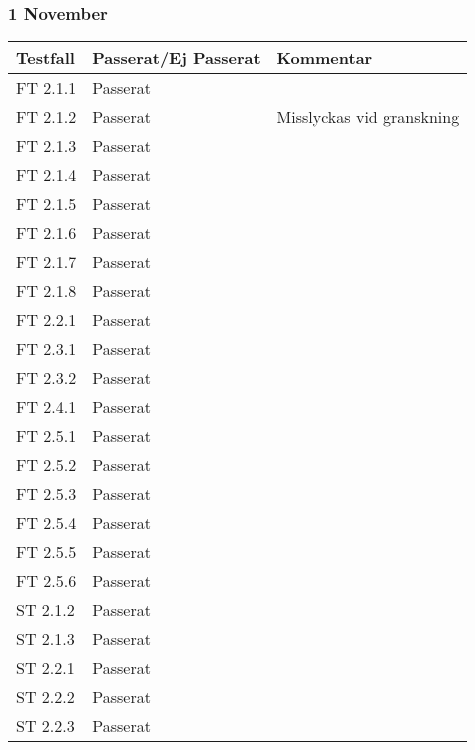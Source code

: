 \documentclass[a4paper]{article}
\begin{document}
\subsubsection{1 November}
\begin{tabular}{| l | l | p{9cm} |}
\hline
Testfall &  Passerat/Ej Passerat & Kommentar\\
\hline
FT 2.1.1 & Passerat & \\
\hline
FT 2.1.2 & Passerat & Misslyckas vid granskning\\
\hline
FT 2.1.3 & Passerat & \\
\hline
FT 2.1.4 & Passerat & \\
\hline
FT 2.1.5 & Passerat & \\
\hline
FT 2.1.6 & Passerat & \\
\hline
FT 2.1.7 & Passerat & \\
\hline
FT 2.1.8 & Passerat & \\
\hline
FT 2.2.1 & Passerat & \\
\hline
FT 2.3.1 & Passerat & \\
\hline
FT 2.3.2 & Passerat & \\
\hline
FT 2.4.1 & Passerat & \\
\hline
FT 2.5.1 & Passerat & \\
\hline
FT 2.5.2 & Passerat & \\
\hline
FT 2.5.3 & Passerat & \\
\hline
FT 2.5.4 & Passerat & \\
\hline
FT 2.5.5 & Passerat & \\
\hline
FT 2.5.6 & Passerat & \\
\hline
ST 2.1.2 & Passerat & \\
\hline
ST 2.1.3 & Passerat & \\
\hline
ST 2.2.1 & Passerat & \\
\hline
ST 2.2.2 & Passerat & \\
\hline
ST 2.2.3 & Passerat & \\
\hline
\end{tabular}
\end{document}
